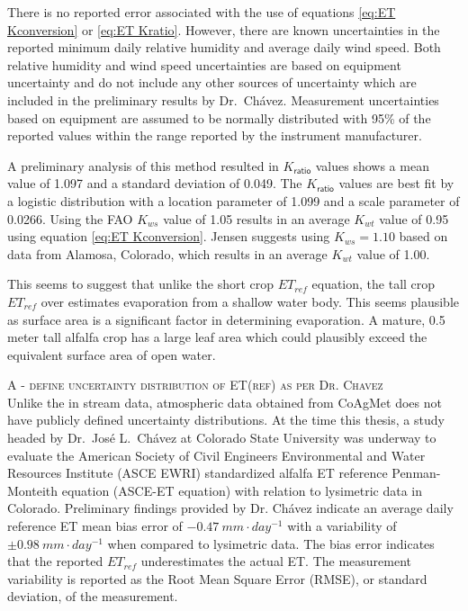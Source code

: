 \begin{linenumbers}
There is no reported error associated with the use of equations \ref{eq:ET Kconversion} or \ref{eq:ET Kratio}.  However, there are known uncertainties in the reported minimum daily relative humidity and average daily wind speed.  Both relative humidity and wind speed uncertainties are based on equipment uncertainty and do not include any other sources of uncertainty which are included in the preliminary results by Dr.\ Ch\'{a}vez.  Measurement uncertainties based on equipment are assumed to be normally distributed with 95\% of the reported values within the range reported by the instrument manufacturer.

A preliminary analysis of this method resulted in $K_\mathsf{ratio}$ values shows a mean value of 1.097 and a standard deviation of 0.049.  The $K_\mathsf{ratio}$ values are best fit by a logistic distribution with a location parameter of 1.099 and a scale parameter of 0.0266.  Using the FAO $K_{ws}$ value of 1.05 results in an average $K_{wt}$ value of 0.95 using equation \ref{eq:ET Kconversion}.  Jensen suggests using $K_{ws}=1.10$ based on data from Alamosa, Colorado, which results in an average $K_{wt}$ value of 1.00.

This seems to suggest that unlike the short crop $ET_{ref}$ equation, the tall crop $ET_{ref}$ over estimates evaporation from a shallow water body.  This seems plausible as surface area is a significant factor in determining evaporation.  A mature, 0.5 meter tall alfalfa crop has a large leaf area which could plausibly exceed the equivalent surface area of open water.

\textsc{A - define uncertainty distribution of ET(ref) as per Dr. Chavez}\\

Unlike the in stream data, atmospheric data obtained from CoAgMet does not have publicly defined uncertainty distributions.  At the time this thesis, a study headed by Dr.\ Jos\'{e} L.\ Ch\'{a}vez at Colorado State University was underway to evaluate the American Society of Civil Engineers Environmental and Water Resources Institute (ASCE EWRI) standardized alfalfa ET reference Penman-Monteith equation (ASCE-ET equation) with relation to lysimetric data in Colorado.  Preliminary findings provided by Dr. Ch\'{a}vez indicate an average daily reference ET mean bias error of $-0.47~mm \cdot day^{-1}$ with a variability of $\pm 0.98~mm \cdot day^{-1}$ when compared to lysimetric data.  The bias error indicates that the reported $ET_{ref}$ underestimates the actual ET.  The measurement variability is reported as the Root Mean Square Error (RMSE), or standard deviation, of the measurement.


\end{linenumbers}
